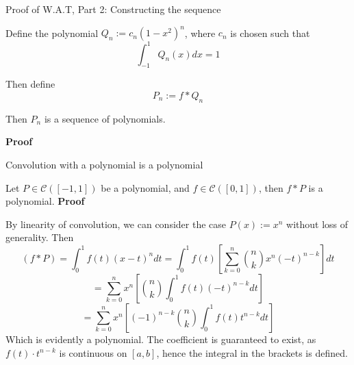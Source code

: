 \begin{theorem} Proof of W.A.T, Part 2: Constructing the sequence

    Define the polynomial $Q_n := c_n(1-x^2)^n$, where $c_n$ is chosen such that
    \[\int_{-1}^1 Q_n(x)dx = 1\]

    Then define
    \[P_n := f \ast Q_n\]

    Then $P_n$ is a sequence of polynomials.

    \textbf{Proof}

    \begin{lemma} Convolution with a polynomial is a polynomial

        Let $P \in \mathscr{C}([-1, 1])$ be a polynomial, and $f \in \mathscr{C}([0, 1])$, then $f \ast P$ is a polynomial.
        \textbf{Proof}

        By linearity of convolution, we can consider the case $P(x) := x^n$ without loss of generality. Then
        \[(f \ast P) = \int_0^1 f(t)(x-t)^ndt = \int_0^1 f(t) \left[\sum_{k=0}^n \binom{n}{k}x^{n}(-t)^{n-k}\right]dt\]
        \[= \sum_{k=0}^n x^n \left[\binom{n}{k}\int_0^1 f(t) (-t)^{n-k}dt\right]\]
        \[= \sum_{k=0}^n x^n \left[(-1)^{n-k}\binom{n}{k}\int_0^1 f(t)t^{n-k}dt\right]\]
        Which is evidently a polynomial. The coefficient is guaranteed to exist, as $f(t) \cdot t^{n-k}$ is continuous on $[a, b]$, hence the integral in the brackets is defined.
    \end{lemma}

\end{theorem}


